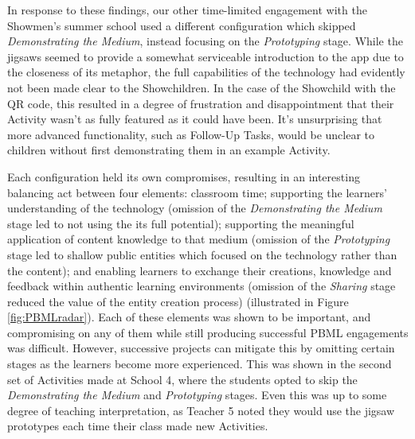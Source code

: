 In response to these findings, our other time-limited engagement with the Showmen's summer school used a different configuration which skipped \textit{Demonstrating the Medium}, instead focusing on the \textit{Prototyping} stage. While the jigsaws seemed to provide a somewhat serviceable introduction to the app due to the closeness of its metaphor, the full capabilities of the technology had evidently not been made clear to the Showchildren. In the case of the Showchild with the QR code, this resulted in a degree of frustration and disappointment that their Activity wasn't as fully featured as it could have been. It's unsurprising that more advanced functionality, such as Follow-Up Tasks, would be unclear to children without first demonstrating them in an example Activity.

Each configuration held its own compromises, resulting in an interesting balancing act between four elements: classroom time; supporting the learners' understanding of the technology (omission of the \textit{Demonstrating the Medium} stage led to not using the its full potential); supporting the meaningful application of content knowledge to that medium (omission of the \textit{Prototyping} stage led to shallow public entities which focused on the technology rather than the content); and enabling learners to exchange their creations, knowledge and feedback within authentic learning environments (omission of the \textit{Sharing} stage reduced the value of the entity creation process) (illustrated in Figure \ref{fig:PBMLradar}). Each of these elements was shown to be important, and compromising on any of them while still producing successful PBML engagements was difficult. However, successive projects can mitigate this by omitting certain stages as the learners become more experienced. This was shown in the second set of Activities made at School 4, where the students opted to skip the \textit{Demonstrating the Medium} and \textit{Prototyping} stages. Even this was up to some degree of teaching interpretation, as Teacher 5 noted they would use the jigsaw prototypes each time their class made new Activities. 

